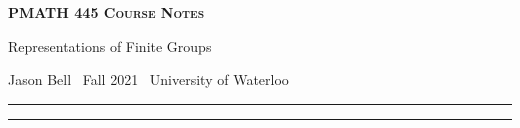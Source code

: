 \documentclass[10pt]{article}
\numberwithin{equation}{section}
\newcommand{\newtitle}[4]{
  \begin{center}
	\huge{\textbf{\textsc{#1 Course Notes}}}
    
	\large{\sc #2}
    
	{\sc #3 \textbullet\, #4 \textbullet\, University of Waterloo}
	\normalsize\vspace{1cm}\hrule
  \end{center}
}
\theoremstyle{newstyle}
\begin{document}
\pagestyle{fancy}
\newtitle{PMATH 445}{Representations of Finite Groups}{Jason Bell}{Fall 2021}

\tableofcontents
\vspace{1cm}\hrule
\fancyhead[R]{\nouppercase\rightmark}
\newpage 
{}



 

\end{document}
